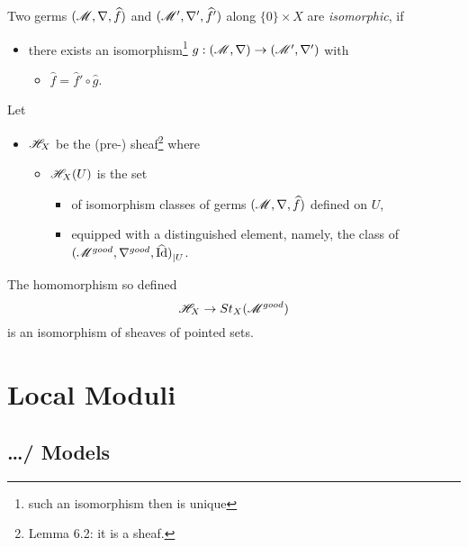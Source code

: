 \begin{defn}
  Two germs $(\mathscr{M},\nabla,\widehat f)$ and $(\mathscr{M}',\nabla',\widehat f')$ along
  $\{0\}\times X$ are \emph{isomorphic}, if
  \begin{itemize}
    \item there exists an isomorphism\footnote{such an isomorphism then is
      unique} $g:(\mathscr{M},\nabla)\to(\mathscr{M}',\nabla')$ with
      \begin{itemize}
        \item $\hat f=\hat f'\circ\hat g$.
      \end{itemize}
  \end{itemize}
\end{defn}
Let
\begin{itemize}
  \item $\mathscr{H}_X$ be the (pre-) sheaf\footnote{Lemma 6.2: it is a sheaf.} where
    \begin{itemize}
      \item $\mathscr{H}_X(U)$ is the set
        \begin{itemize}
          \item of isomorphism classes of germs $(\mathscr{M},\nabla,\widehat f)$ defined
            on $U$,
          \item equipped with a distinguished element, namely, the class of
            ${(\mathscr{M}^{good},\nabla^{good},\widehat{\operatorname{Id}})}_{|U}$.
        \end{itemize}
    \end{itemize}
\end{itemize}
\begin{thm}
  The homomorphism so defined
  \[
    \mathscr{H}_X\to St_X(\mathscr{M}^{good})
  \]
  is an isomorphism of sheaves of pointed sets.
\end{thm}

\section{Local Moduli}
\subsection{\dots / Models}

